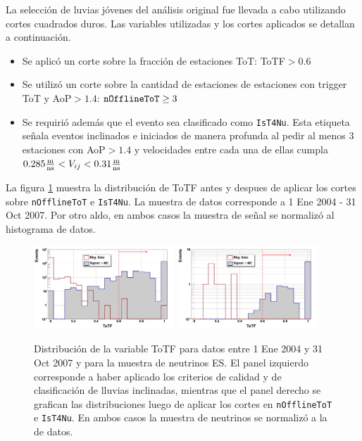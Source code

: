 	La selección de luvias jóvenes del análisis original fue llevada a cabo utilizando cortes cuadrados duros.
	Las variables utilizadas y los cortes aplicados se detallan a continuación.
	\begin{itemize}
	 \item Se aplicó un corte sobre la fracción de estaciones ToT: ToTF$>0.6$
	 \item Se utilizó un corte sobre la cantidad de estaciones de estaciones con trigger ToT y AoP$>1.4$: ${\tt nOfflineToT}\geq3$
	 \item Se requirió además que el evento sea clasificado como \texttt{IsT4Nu}. Esta etiqueta señala eventos inclinados e iniciados de manera profunda al pedir al menos 3 estaciones con AoP$>1.4$ y velocidades entre cada una de ellas cumpla $0.285{\rm \frac{m}{ns}}<V_{ij}<0.31{\rm \frac{m}{ns}}$
	\end{itemize}

	La figura \ref{fig:totFES} muestra la distribución de ToTF antes y despues de aplicar los cortes sobre \texttt{nOfflineToT} e \texttt{IsT4Nu}.
	La muestra de datos corresponde a 1 Ene 2004 - 31 Oct 2007. Por otro aldo, en ambos casos la muestra de señal se normalizó al histograma de datos.
	\begin{figure}[ht]
	\begin{center}
	\includegraphics[width=0.47\textwidth]{fig/seleccionAuger/ToTF_forThesis}\hfill
	\includegraphics[width=0.47\textwidth]{fig/seleccionAuger/ToTF_with_noToT_and_hasTriangle_forThesis}
	\caption{Distribución de la variable ToTF para datos entre 1 Ene 2004 y 31 Oct 2007 y para la muestra de neutrinos ES. El panel izquierdo corresponde a haber aplicado los criterios de calidad y de clasificación de lluvias inclinadas, mientras que el panel derecho se grafican las distribuciones luego de aplicar los cortes en \texttt{nOfflineToT} e \texttt{IsT4Nu}. En ambos casos la muestra de neutrinos se normalizó a la de datos.}
	\label{fig:totFES}
	\end{center}
	\end{figure}
	
